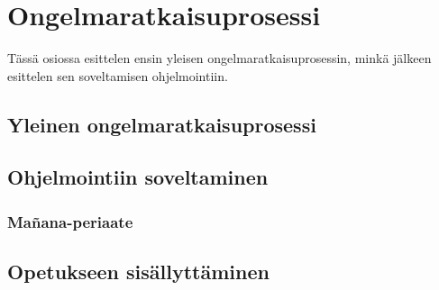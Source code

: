 \section{Ongelmaratkaisuprosessi}

Tässä osiossa esittelen ensin yleisen ongelmaratkaisuprosessin, minkä jälkeen
esittelen sen soveltamisen ohjelmointiin.

\subsection{Yleinen ongelmaratkaisuprosessi}

\subsection{Ohjelmointiin soveltaminen}

\subsubsection{Mañana-periaate}


\subsection{Opetukseen sisällyttäminen}

